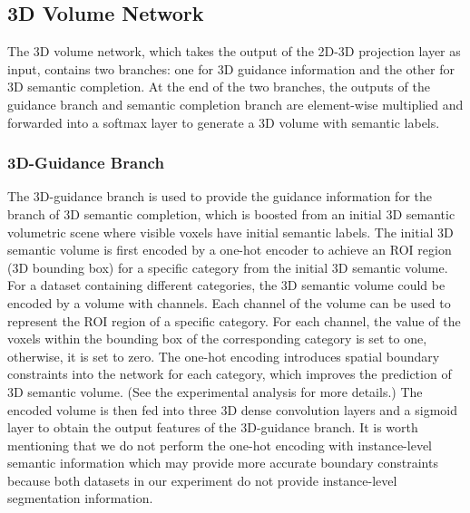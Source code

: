 \documentclass[letterpaper]{article} \usepackage{aaai20}  \usepackage{times}  \usepackage{helvet} \usepackage{courier}  \usepackage[hyphens]{url}  \usepackage{graphicx} \urlstyle{rm} \def\UrlFont{\rm}  \usepackage{graphicx}  \frenchspacing  \setlength{\pdfpagewidth}{8.5in}  \setlength{\pdfpageheight}{11in}
\begin{document}
\subsection{3D Volume Network} 
The 3D volume network, which takes the output of the 2D-3D projection layer as input, contains two branches: one for 3D guidance information and the other for 3D semantic completion. At the end of the two branches, the outputs of the guidance branch and semantic completion branch are element-wise multiplied and forwarded into a softmax layer to generate a 3D volume with semantic labels.

\subsubsection{3D-Guidance Branch}
\label{3DSegm} 
The 3D-guidance branch is used to provide the guidance information for the branch of 3D semantic completion, which is boosted from an initial 3D semantic volumetric scene where visible voxels have initial semantic labels.
The initial 3D semantic volume is first encoded by a one-hot encoder to achieve an ROI region (3D bounding box) for a specific category from the initial 3D semantic volume. For a dataset containing  different categories, the 3D semantic volume could be encoded by a volume with  channels. Each channel of the volume can be used to represent the ROI region of a specific category. For each channel, the value of the voxels within the bounding box of the corresponding category is set to one, otherwise, it is set to zero. The one-hot encoding introduces spatial boundary constraints into the network for each category, which improves the prediction of 3D semantic volume. (See the experimental analysis for more details.) The encoded volume is then fed into three 3D dense convolution layers and a sigmoid layer to obtain the output features of the 3D-guidance branch. It is worth mentioning that we do not perform the one-hot encoding with instance-level semantic information which may provide more accurate boundary constraints because both datasets in our experiment do not provide instance-level segmentation information. 
\end{document}
